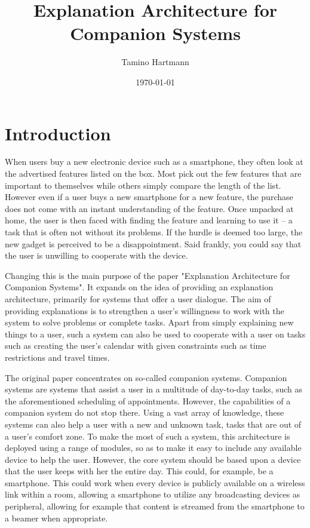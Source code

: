 \documentclass[a4paper]{article}
\begin{document}
\title{Explanation Architecture for Companion Systems}
\author{Tamino Hartmann}
\date{\today}

\maketitle
\newpage

\tableofcontents

\newpage

\section{Introduction}

When users buy a new electronic device such as a smartphone, they often look at the advertised features listed on the box. Most pick out the few features that are important to themselves while others simply compare the length of the list. However even if a user buys a new smartphone for a new feature, the purchase does not come with an instant understanding of the feature. Once unpacked at home, the user is then faced with finding the feature and learning to use it – a task that is often not without its problems. If the hurdle is deemed too large, the new gadget is perceived to be a disappointment. Said frankly, you could say that the user is unwilling to cooperate with the device.

Changing this is the main purpose of the paper "Explanation Architecture for Companion Systems"\cite{origin}. It expands on the idea of providing an explanation architecture, primarily for systems that offer a user dialogue. The aim of providing explanations is to strengthen a user's willingness to work with the system to solve problems or complete tasks. Apart from simply explaining new things to a user, such a system can also be used to cooperate with a user on tasks such as creating the user's calendar with given constraints such as time restrictions and travel times.

The original paper concentrates on so-called companion systems. Companion systems are systems that assist a user in a multitude of day-to-day tasks, such as the aforementioned scheduling of appointments. However, the capabilities of a companion system do not stop there. Using a vast array of knowledge, these systems can also help a user with a new and unknown task, tasks that are out of a user's comfort zone. To make the most of such a system, this architecture is deployed using a range of modules, so as to make it easy to include any available device to help the user. However, the core system should be based upon a device that the user keeps with her the entire day. This could, for example, be a smartphone. This could work when every device is publicly available on a wireless link within a room, allowing a smartphone to utilize any broadcasting devices as peripheral, allowing for example that content is streamed from the smartphone to a beamer when appropriate.
\end{document}
